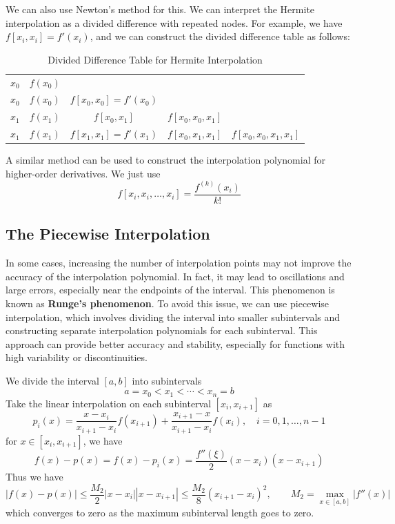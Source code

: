\documentclass{matharticle}
\begin{document}
We can also use Newton's method for this. We can interpret the Hermite interpolation as a divided difference with repeated nodes. For example, we have $f[x_i, x_i] = f'(x_i)$, and we can construct the divided difference table as follows:
\begin{table}[H]
	\centering
	\begin{tabular}{c|c|c|c|c}
		$x_0$ & $f(x_0)$ &                         &                    &                         \\
		$x_0$ & $f(x_0)$ & $f[x_0, x_0] = f'(x_0)$ &                    &                         \\
		$x_1$ & $f(x_1)$ & $f[x_0, x_1]$           & $f[x_0, x_0, x_1]$ &                         \\
		$x_1$ & $f(x_1)$ & $f[x_1, x_1] = f'(x_1)$ & $f[x_0, x_1, x_1]$ & $f[x_0, x_0, x_1, x_1]$
	\end{tabular}
	\caption{Divided Difference Table for Hermite Interpolation}
\end{table}
A similar method can be used to construct the interpolation polynomial for higher-order derivatives. We just use
\begin{equation}
	f[x_i, x_i, \ldots, x_i] = \frac{f^{(k)}(x_i)}{k!}
\end{equation}

\subsection{The Piecewise Interpolation}
In some cases, increasing the number of interpolation points may not improve the accuracy of the interpolation polynomial. In fact, it may lead to oscillations and large errors, especially near the endpoints of the interval. This phenomenon is known as \textbf{Runge's phenomenon}. To avoid this issue, we can use piecewise interpolation, which involves dividing the interval into smaller subintervals and constructing separate interpolation polynomials for each subinterval. This approach can provide better accuracy and stability, especially for functions with high variability or discontinuities.

We divide the interval $[a, b]$ into subintervals
\begin{equation*}
	a = x_0 < x_1 < \cdots < x_n = b
\end{equation*}
Take the linear interpolation on each subinterval $[x_i, x_{i+1}]$ as
\begin{equation*}
	p_i(x) = \frac{x - x_i}{x_{i+1} - x_i} f(x_{i+1}) + \frac{x_{i+1} - x}{x_{i+1} - x_i} f(x_i), \quad i = 0, 1, \ldots, n-1
\end{equation*}
for $x\in [x_i, x_{i+1}]$, we have
\begin{equation*}
	f(x) - p(x) = f(x) - p_i(x) = \frac{f''(\xi)}{2} (x - x_i)(x - x_{i+1})
\end{equation*}
Thus we have
\begin{equation*}
	|f(x) - p(x)| \leq \frac{M_2}{2}|x - x_i||x - x_{i+1}| \leq \frac{M_2}{8} (x_{i+1} - x_i)^2, \qquad M_2 = \max_{x \in [a, b]} |f''(x)|
\end{equation*}
which converges to zero as the maximum subinterval length goes to zero.
\end{document}
